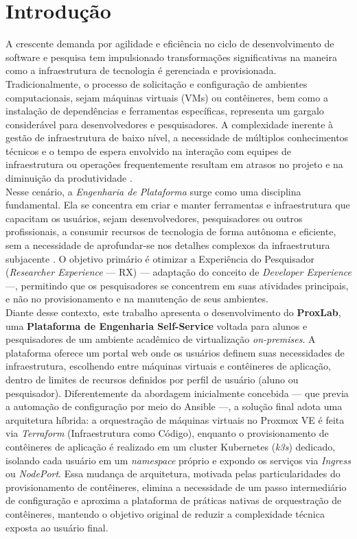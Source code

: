 \chapter{Introdução}

A crescente demanda por agilidade e eficiência no ciclo de desenvolvimento de software e pesquisa tem impulsionado transformações significativas na maneira como a infraestrutura de tecnologia é gerenciada e provisionada. Tradicionalmente, o processo de solicitação e configuração de ambientes computacionais, sejam máquinas virtuais (VMs) ou contêineres, bem como a instalação de dependências e ferramentas específicas, representa um gargalo considerável para desenvolvedores e pesquisadores. A complexidade inerente à gestão de infraestrutura de baixo nível, a necessidade de múltiplos conhecimentos técnicos e o tempo de espera envolvido na interação com equipes de infraestrutura ou operações frequentemente resultam em atrasos no projeto e na diminuição da produtividade \cite{KunalBhandari}.\\

Nesse cenário, a \textit{Engenharia de Plataforma} surge como uma disciplina fundamental. Ela se concentra em criar e manter ferramentas e infraestrutura que capacitam os usuários, sejam desenvolvedores, pesquisadores ou outros profissionais, a consumir recursos de tecnologia de forma autônoma e eficiente, sem a necessidade de aprofundar-se nos detalhes complexos da infraestrutura subjacente \cite{cncfPlatforms:online,Anjum2026}. O objetivo primário é otimizar a Experiência do Pesquisador (\textit{Researcher Experience} — RX) — adaptação do conceito de \textit{Developer Experience} \cite{Fagerholm2012,Greiler2023} —, permitindo que os pesquisadores se concentrem em suas atividades principais, e não no provisionamento e na manutenção de seus ambientes.\\

Diante desse contexto, este trabalho apresenta o desenvolvimento do \textbf{ProxLab}, uma \textbf{Plataforma de Engenharia Self-Service} voltada para alunos e pesquisadores de um ambiente acadêmico de virtualização \textit{on-premises}. A plataforma oferece um portal web onde os usuários definem suas necessidades de infraestrutura, escolhendo entre máquinas virtuais e contêineres de aplicação, dentro de limites de recursos definidos por perfil de usuário (aluno ou pesquisador). Diferentemente da abordagem inicialmente concebida — que previa a automação de configuração por meio do Ansible —, a solução final adota uma arquitetura híbrida: a orquestração de máquinas virtuais no Proxmox VE é feita via \textit{Terraform} (Infraestrutura como Código), enquanto o provisionamento de contêineres de aplicação é realizado em um cluster Kubernetes (\textit{k3s}) dedicado, isolando cada usuário em um \textit{namespace} próprio e expondo os serviços via \textit{Ingress} ou \textit{NodePort}. Essa mudança de arquitetura, motivada pelas particularidades do provisionamento de contêineres, elimina a necessidade de um passo intermediário de configuração e aproxima a plataforma de práticas nativas de orquestração de contêineres, mantendo o objetivo original de reduzir a complexidade técnica exposta ao usuário final.




